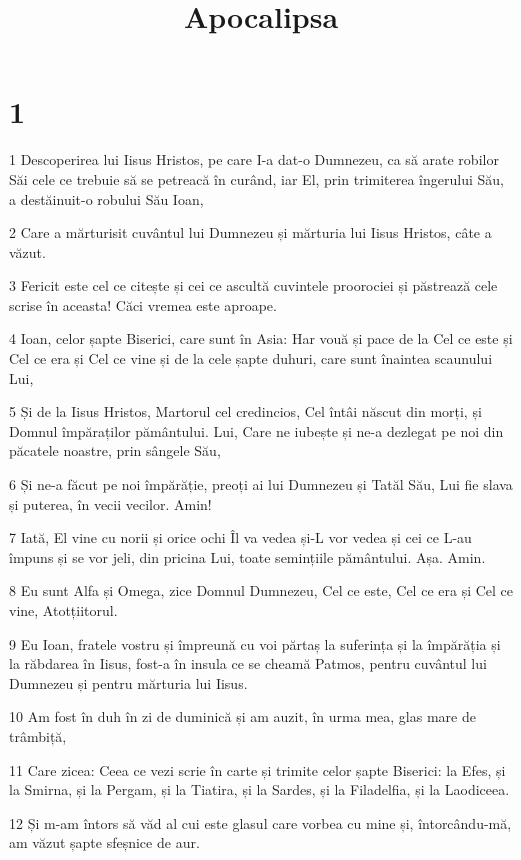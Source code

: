 

\title{Apocalipsa}


\chapter{1}

\par 1 Descoperirea lui Iisus Hristos, pe care I-a dat-o Dumnezeu, ca să arate robilor Săi cele ce trebuie să se petreacă în curând, iar El, prin trimiterea îngerului Său, a destăinuit-o robului Său Ioan,
\par 2 Care a mărturisit cuvântul lui Dumnezeu și mărturia lui Iisus Hristos, câte a văzut.
\par 3 Fericit este cel ce citește și cei ce ascultă cuvintele proorociei și păstrează cele scrise în aceasta! Căci vremea este aproape.
\par 4 Ioan, celor șapte Biserici, care sunt în Asia: Har vouă și pace de la Cel ce este și Cel ce era și Cel ce vine și de la cele șapte duhuri, care sunt înaintea scaunului Lui,
\par 5 Și de la Iisus Hristos, Martorul cel credincios, Cel întâi născut din morți, și Domnul împăraților pământului. Lui, Care ne iubește și ne-a dezlegat pe noi din păcatele noastre, prin sângele Său,
\par 6 Și ne-a făcut pe noi împărăție, preoți ai lui Dumnezeu și Tatăl Său, Lui fie slava și puterea, în vecii vecilor. Amin!
\par 7 Iată, El vine cu norii și orice ochi Îl va vedea și-L vor vedea și cei ce L-au împuns și se vor jeli, din pricina Lui, toate semințiile pământului. Așa. Amin.
\par 8 Eu sunt Alfa și Omega, zice Domnul Dumnezeu, Cel ce este, Cel ce era și Cel ce vine, Atotțiitorul.
\par 9 Eu Ioan, fratele vostru și împreună cu voi părtaș la suferința și la împărăția și la răbdarea în Iisus, fost-a în insula ce se cheamă Patmos, pentru cuvântul lui Dumnezeu și pentru mărturia lui Iisus.
\par 10 Am fost în duh în zi de duminică și am auzit, în urma mea, glas mare de trâmbiță,
\par 11 Care zicea: Ceea ce vezi scrie în carte și trimite celor șapte Biserici: la Efes, și la Smirna, și la Pergam, și la Tiatira, și la Sardes, și la Filadelfia, și la Laodiceea.
\par 12 Și m-am întors să văd al cui este glasul care vorbea cu mine și, întorcându-mă, am văzut șapte sfeșnice de aur.
